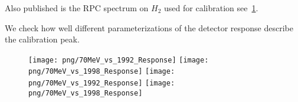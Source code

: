 




Also published is the RPC spectrum on $H_2$ used for calibration see~\ref{p004}.

We check how well different parameterizations of the detector response describe the
calibration peak.

\begin{figure}[!h]
 \begin{center}
 \texttt{[image: png/70MeV\_vs\_1992\_Response]} 
 \texttt{[image: png/70MeV\_vs\_1998\_Response]} 
 \texttt{[image: png/70MeV\_vs\_1992\_Response]} 
 \texttt{[image: png/70MeV\_vs\_1998\_Response]} 
 \end{center}
 \caption{}
 \label{p004}
 \end{figure}

